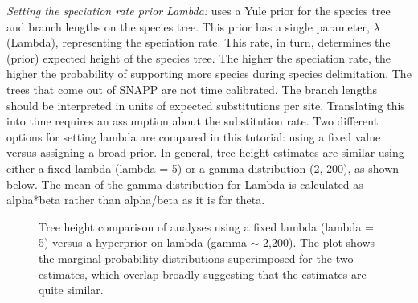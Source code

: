 {\textit{Setting the speciation rate prior Lambda:}  uses a Yule prior for the species tree and branch lengths on the species tree. This prior has a single parameter, {$\lambda$} (Lambda), representing the speciation rate. This rate, in turn, determines the (prior) expected height of the species tree. The higher the speciation rate, the higher the probability of supporting more species during species delimitation. The trees that come out of SNAPP are not time calibrated. The branch lengths should be interpreted in units of expected substitutions per site. Translating this into time requires an assumption about the substitution rate. Two different options for setting lambda are compared in this tutorial: using a fixed value versus assigning a broad prior. In general, tree height estimates are similar using either a fixed lambda (lambda = 5) or a gamma distribution (2, 200), as shown below. The mean of the gamma distribution for Lambda is calculated as alpha*beta rather than alpha/beta as it is for theta. 

     \begin{figure}[htbp]
        \centering
        \caption{Tree height comparison of analyses using a fixed lambda (lambda = 5) versus a hyperprior on lambda (gamma {$\sim$} 2,200). The plot shows the marginal probability distributions superimposed for the two estimates, which overlap broadly suggesting that the estimates are quite similar.}
        \label{fig:lambda_comparision}
    \end{figure}  
    
}
